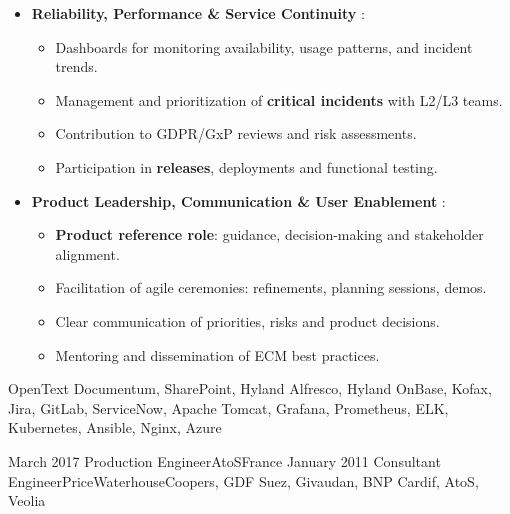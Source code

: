 \begin{experiences}
{\begin{itemize}[left=0pt,label={},itemsep=0.5em]
          \vspace{0.3em}

          \item \textbf{Reliability, Performance \& Service Continuity} :
            \begin{itemize}[itemsep=0.2em,topsep=0.2em,parsep=0pt]
              \small
              \item Dashboards for monitoring availability, usage patterns, and incident trends.
              \item Management and prioritization of \textbf{critical incidents} with L2/L3 teams.
              \item Contribution to GDPR/GxP reviews and risk assessments.
              \item Participation in \textbf{releases}, deployments and functional testing.
            \end{itemize}

          \vspace{0.3em}

          \item \textbf{Product Leadership, Communication \& User Enablement} :
            \begin{itemize}[itemsep=0.2em,topsep=0.2em,parsep=0pt]
              \small
              \item \textbf{Product reference role}: guidance, decision-making and stakeholder alignment.
              \item Facilitation of agile ceremonies: refinements, planning sessions, demos.
              \item Clear communication of priorities, risks and product decisions.
              \item Mentoring and dissemination of ECM best practices.
            \end{itemize}

        \end{itemize}
        \vspace{0.3em}
    }
    {OpenText Documentum, SharePoint, Hyland Alfresco, Hyland OnBase, Kofax, Jira, GitLab, ServiceNow, Apache Tomcat, Grafana, Prometheus, ELK, Kubernetes, Ansible, Nginx, Azure}

\emptySeparator
\emptySeparator

\consultantexperience
    {March 2017} {Production Engineer}{AtoS}{France}
    {January 2011} {Consultant Engineer}{PriceWaterhouseCoopers, GDF Suez, Givaudan, BNP Cardif, AtoS, Veolia} {
        \begin{itemize}[left=0pt,label={},itemsep=0.4em]
        \vspace{0.3em}


\end{itemize}}
\end{experiences}
